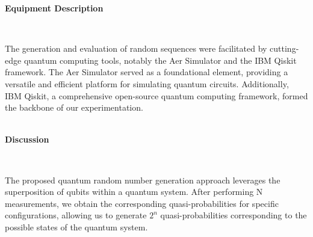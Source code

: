 \documentclass[12pt]{article}
\begin{document}
	   		{\raggedright\large\textbf{Equipment Description}}\\\par
	   		{The generation and evaluation of random sequences were facilitated by cutting-edge quantum computing tools, notably the
	   			Aer Simulator and the IBM Qiskit framework. The Aer Simulator served as a foundational element, providing a versatile and
	   			efficient platform for simulating quantum circuits. Additionally, IBM Qiskit, a comprehensive open-source quantum computing
	   			framework, formed the backbone of our experimentation.}\\\\
	   		{\raggedright\large\textbf{Discussion}}\\\par
	   		{The proposed quantum random number generation approach leverages the superposition of qubits within a quantum system.
	   			After performing N measurements, we obtain the corresponding quasi-probabilities for specific configurations, allowing us to
	   			generate $2^n$ quasi-probabilities corresponding to the possible states of the quantum system.}
   		
\end{document}
